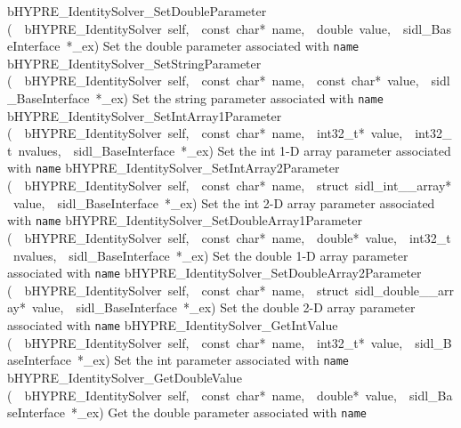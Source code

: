 \documentclass{article}
\begin{document}
\begin{cxxentry}
\begin{cxxentry}
\begin{cxxnames}
        {}
\label{cxx.5.9.17}
        {bHYPRE\_IdentitySolver\_SetDoubleParameter}
        {(\ \ bHYPRE\_IdentitySolver\ self,\ \ const\ char*\ name,\ \ double\ value,\ \ sidl\_BaseInterface\ *\_ex)}
        {
Set the double parameter associated with {\tt name}}
        {}
\label{cxx.5.9.18}
        {bHYPRE\_IdentitySolver\_SetStringParameter}
        {(\ \ bHYPRE\_IdentitySolver\ self,\ \ const\ char*\ name,\ \ const\ char*\ value,\ \ sidl\_BaseInterface\ *\_ex)}
        {
Set the string parameter associated with {\tt name}}
        {}
\label{cxx.5.9.19}
        {bHYPRE\_IdentitySolver\_SetIntArray1Parameter}
        {(\ \ bHYPRE\_IdentitySolver\ self,\ \ const\ char*\ name,\ \ int32\_t*\ value,\ \ int32\_t\ nvalues,\ \ sidl\_BaseInterface\ *\_ex)}
        {
Set the int 1-D array parameter associated with {\tt name}}
        {}
\label{cxx.5.9.20}
        {bHYPRE\_IdentitySolver\_SetIntArray2Parameter}
        {(\ \ bHYPRE\_IdentitySolver\ self,\ \ const\ char*\ name,\ \ struct\ sidl\_int\_\_array*\ value,\ \ sidl\_BaseInterface\ *\_ex)}
        {
Set the int 2-D array parameter associated with {\tt name}}
        {}
\label{cxx.5.9.21}
        {bHYPRE\_IdentitySolver\_SetDoubleArray1Parameter}
        {(\ \ bHYPRE\_IdentitySolver\ self,\ \ const\ char*\ name,\ \ double*\ value,\ \ int32\_t\ nvalues,\ \ sidl\_BaseInterface\ *\_ex)}
        {
Set the double 1-D array parameter associated with {\tt name}}
        {}
\label{cxx.5.9.22}
        {bHYPRE\_IdentitySolver\_SetDoubleArray2Parameter}
        {(\ \ bHYPRE\_IdentitySolver\ self,\ \ const\ char*\ name,\ \ struct\ sidl\_double\_\_array*\ value,\ \ sidl\_BaseInterface\ *\_ex)}
        {
Set the double 2-D array parameter associated with {\tt name}}
        {}
\label{cxx.5.9.23}
        {bHYPRE\_IdentitySolver\_GetIntValue}
        {(\ \ bHYPRE\_IdentitySolver\ self,\ \ const\ char*\ name,\ \ int32\_t*\ value,\ \ sidl\_BaseInterface\ *\_ex)}
        {
Set the int parameter associated with {\tt name}}
        {}
\label{cxx.5.9.24}
        {bHYPRE\_IdentitySolver\_GetDoubleValue}
        {(\ \ bHYPRE\_IdentitySolver\ self,\ \ const\ char*\ name,\ \ double*\ value,\ \ sidl\_BaseInterface\ *\_ex)}
        {
Get the double parameter associated with {\tt name}}

\end{cxxnames}
\end{cxxentry}
\end{cxxentry}
\end{document}
